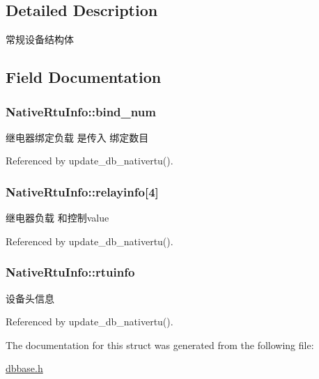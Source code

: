 \subsection{Detailed Description}
常规设备结构体 

\subsection{Field Documentation}
\hypertarget{structNativeRtuInfo_ae673b07d8c87e05626830f4e1b813f99}{
\subsubsection[{bind\-\_\-num}]{ Native\-Rtu\-Info\-::bind\-\_\-num}}\label{structNativeRtuInfo_ae673b07d8c87e05626830f4e1b813f99}


继电器绑定负载 是传入 绑定数目 



Referenced by update\-\_\-db\-\_\-nativertu().

\hypertarget{structNativeRtuInfo_ad9f9b53a53485f4e89e85dbc510348b6}{
\subsubsection[{relayinfo}]{ Native\-Rtu\-Info\-::relayinfo\mbox{[}4\mbox{]}}}\label{structNativeRtuInfo_ad9f9b53a53485f4e89e85dbc510348b6}


继电器负载 和控制value 



Referenced by update\-\_\-db\-\_\-nativertu().

\hypertarget{structNativeRtuInfo_aadeca7477bda9a54e67e8b6409998197}{
\subsubsection[{rtuinfo}]{ Native\-Rtu\-Info\-::rtuinfo}}\label{structNativeRtuInfo_aadeca7477bda9a54e67e8b6409998197}


设备头信息 



Referenced by update\-\_\-db\-\_\-nativertu().



The documentation for this struct was generated from the following file\-:\begin{DoxyCompactItemize}
\item 
\hyperlink{dbbase_8h}{dbbase.\-h}\end{DoxyCompactItemize}
